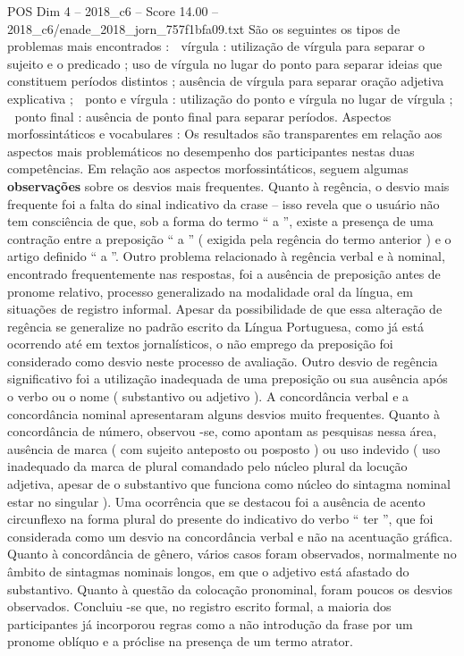 \begin{textsample}{POS Dim 4 – 2018\_c6 – Score 14.00 – 2018\_c6/enade\_2018\_jorn\_757f1bfa09.txt}
São os seguintes os tipos de problemas mais encontrados :  vírgula : utilização de vírgula para separar o sujeito e o predicado ; uso de vírgula no lugar do ponto para separar ideias que constituem períodos distintos ; ausência de vírgula para separar oração adjetiva explicativa ;  ponto e vírgula : utilização do ponto e vírgula no lugar de vírgula ;  ponto final : ausência de ponto final para separar períodos.
Aspectos morfossintáticos e vocabulares : Os resultados são transparentes em relação aos aspectos mais problemáticos no desempenho dos participantes nestas duas competências.
Em relação aos aspectos morfossintáticos, seguem algumas \textbf{observações} sobre os desvios mais frequentes.
Quanto à regência, o desvio mais frequente foi a falta do sinal indicativo da crase – isso revela que o usuário não tem consciência de que, sob a forma do termo “ a ”, existe a presença de uma contração entre a preposição “ a ” ( exigida pela regência do termo anterior ) e o artigo definido “ a ”.
Outro problema relacionado à regência verbal e à nominal, encontrado frequentemente nas respostas, foi a ausência de preposição antes de pronome relativo, processo generalizado na modalidade oral da língua, em situações de registro informal.
Apesar da possibilidade de que essa alteração de regência se generalize no padrão escrito da Língua Portuguesa, como já está ocorrendo até em textos jornalísticos, o não emprego da preposição foi considerado como desvio neste processo de avaliação.
Outro desvio de regência significativo foi a utilização inadequada de uma preposição ou sua ausência após o verbo ou o nome ( substantivo ou adjetivo ).
A concordância verbal e a concordância nominal apresentaram alguns desvios muito frequentes.
Quanto à concordância de número, observou -se, como apontam as pesquisas nessa área, ausência de marca ( com sujeito anteposto ou posposto ) ou uso indevido ( uso inadequado da marca de plural comandado pelo núcleo plural da locução adjetiva, apesar de o substantivo que funciona como núcleo do sintagma nominal estar no singular ).
Uma ocorrência que se destacou foi a ausência de acento circunflexo na forma plural do presente do indicativo do verbo “ ter ”, que foi considerada como um desvio na concordância verbal e não na acentuação gráfica.
Quanto à concordância de gênero, vários casos foram observados, normalmente no âmbito de sintagmas nominais longos, em que o adjetivo está afastado do substantivo.
Quanto à questão da colocação pronominal, foram poucos os desvios observados.
Concluiu -se que, no registro escrito formal, a maioria dos participantes já incorporou regras como a não introdução da frase por um pronome oblíquo e a próclise na presença de um termo atrator.

\end{textsample}

